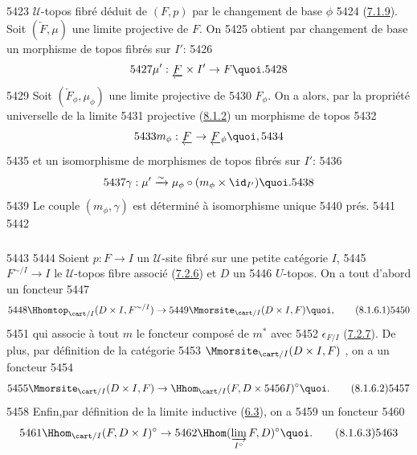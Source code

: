   5423	$𝒰$-topos fibré déduit de $(F, p)$ par le changement de base $\phi$
  5424	(\hyperref[VI.subsubsec7.1.9]{7.1.9}). Soit $(\underleftarrow{F}, \mu)$ une limite projective de $F$. On
  5425	obtient par changement de base un morphisme de topos fibrés sur $I'$:
  5426	$$
  5427	\mu' : \underleftarrow{F} \times I' \to F{\quoi}.
  5428	$$
  5429	Soit $(\underleftarrow{F}_{\phi}, \mu_{\phi})$ une limite projective de
  5430	$F_{\phi}$. On a alors, par la propriété universelle de la limite
  5431	projective (\hyperref[VI.subsubsec8.1.2]{8.1.2}) un morphisme de topos
  5432	$$
  5433	m_{\phi} : \underleftarrow{F} \to \underleftarrow{F}_{\phi}{\quoi},
  5434	$$
  5435	et un isomorphisme de morphismes de topos fibrés sur $I'$:
  5436	$$
  5437	\gamma : \mu'\xrightarrow{\sim} \mu_{\phi} \circ (m_{\phi} \times \id_{I'}){\quoi}.
  5438	$$
  5439	Le couple $(m_{\phi}, \gamma)$ est déterminé à isomorphisme unique
  5440	prés.
  5441	
  5442	\subsubsection{}
  5443	
  5444	Soient $p : F \to I$ un $𝒰$-site fibré sur une petite catégorie $I$,
  5445	$F^{\sim/I} \to I$ le $𝒰$-topos fibre associé (\hyperref[VI.subsubsec7.2.6]{7.2.6}) et $D$ un
  5446	$U$-topos. On a tout d'abord un foncteur
  5447	\begin{equation*}
  5448	\Hhomtop_{\cart / I} (D \times I, F^{\sim/I}) \to
  5449	\Mmorsite_{\cart/I}(D \times I, F){\quoi},\tag{8.1.6.1}
  5450	\end{equation*}
  5451	qui associe à tout $m$ le foncteur composé de $m^{\ast}$ avec
  5452	$\epsilon_{F /I}$ (\hyperref[VI.prop7.2.7]{7.2.7}). De plus, par définition de la catégorie
  5453	$\Mmorsite_{\cart /I} (D \times I, F)$ , on a un foncteur
  5454	\begin{equation*}
  5455	\Mmorsite_{\cart/I}(D \times I, F) \to \Hhom_{\cart / I} (F, D \times
  5456	I)^{\circ}{\quoi}.\tag{8.1.6.2}
  5457	\end{equation*}
  5458	Enfin,\pageoriginale par définition de la limite inductive (\hyperref[VI.def6.3]{6.3}), on a
  5459	un foncteur
  5460	\begin{equation*}
  5461	\Hhom_{\cart / I} (F, D \times I)^{\circ} \to
  5462	\Hhom(\varinjlim_{I^{\circ}}F, D)^{\circ}{\quoi}.\tag{8.1.6.3}
  5463	\end{equation*}
